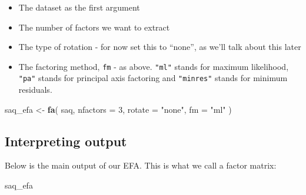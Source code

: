 \documentclass[
]{book}
\newenvironment{Shaded}{\begin{snugshade}}{\end{snugshade}}
\newcommand{\AttributeTok}[1]{\textcolor[rgb]{0.13,0.29,0.53}{#1}}
\newcommand{\DecValTok}[1]{\textcolor[rgb]{0.00,0.00,0.81}{#1}}
\newcommand{\FunctionTok}[1]{\textcolor[rgb]{0.13,0.29,0.53}{\textbf{#1}}}
\newcommand{\NormalTok}[1]{#1}
\newcommand{\OtherTok}[1]{\textcolor[rgb]{0.56,0.35,0.01}{#1}}
\newcommand{\StringTok}[1]{\textcolor[rgb]{0.31,0.60,0.02}{#1}}
\providecommand{\tightlist}{%
  \setlength{\itemsep}{0pt}\setlength{\parskip}{0pt}}
\begin{document}
\begin{itemize}
\tightlist
\item
  The dataset as the first argument
\item
  The number of factors we want to extract
\item
  The type of rotation - for now set this to ``none'', as we'll talk about this later
\item
  The factoring method, \texttt{fm} - as above. \texttt{"ml"} stands for maximum likelihood, \texttt{"pa"} stands for principal axis factoring and \texttt{"minres"} stands for minimum residuals.
\end{itemize}

\begin{Shaded}
\begin{Highlighting}[]
\NormalTok{saq\_efa }\OtherTok{\textless{}{-}} \FunctionTok{fa}\NormalTok{(}
\NormalTok{  saq,}
  \AttributeTok{nfactors =} \DecValTok{3}\NormalTok{,}
  \AttributeTok{rotate =} \StringTok{"none"}\NormalTok{,}
  \AttributeTok{fm =} \StringTok{"ml"}
\NormalTok{)}
\end{Highlighting}
\end{Shaded}

\hypertarget{interpreting-output-1}{%
\subsection{Interpreting output}\label{interpreting-output-1}}

Below is the main output of our EFA. This is what we call a factor matrix:

\begin{Shaded}
\begin{Highlighting}[]
\NormalTok{saq\_efa}
\end{Highlighting}
\end{Shaded}
\end{document}

